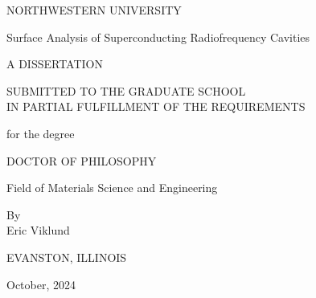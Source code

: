 \documentclass[12pt]{report}
\begin{document}
    \begin{titlepage}
        \begin{center}

            NORTHWESTERN UNIVERSITY\\

            \vfill
    
            Surface Analysis of Superconducting Radiofrequency Cavities\\

            \vfill

            A DISSERTATION\\

            \vfill

            SUBMITTED TO THE GRADUATE SCHOOL\\
            IN PARTIAL FULFILLMENT OF THE REQUIREMENTS\\

            \vfill

            for the degree\\

            \vfill

            DOCTOR OF PHILOSOPHY\\
            
            \vfill

            Field of Materials Science and Engineering\\

            \vfill

            By\\
            \vspace*{0.5cm}
            Eric Viklund\\

            \vfill

            EVANSTON, ILLINOIS\\

            \vfill

            October, 2024\\
                
        \end{center}
    \end{titlepage}





    \begin{abstract}
        
    \end{abstract}
\end{document}

